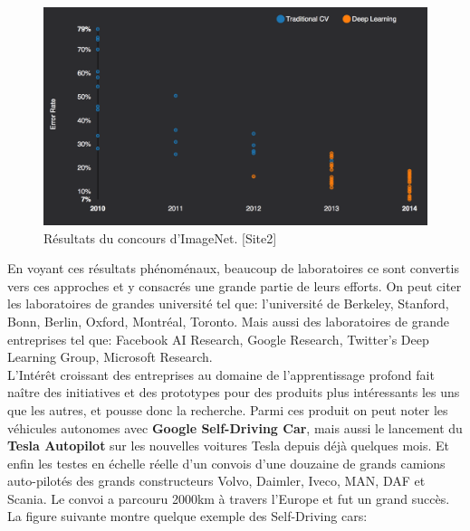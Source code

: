 \begin{figure}[H]
	\centering
		\includegraphics[width=5in]{Figures/clairifaiIMAGENET.png}
	\caption[An Electron]{Résultats du concours d'ImageNet. [Site2]}
	\label{fig:Electron}
\end{figure}

	En voyant ces résultats phénoménaux, beaucoup de laboratoires ce sont convertis vers ces approches et y consacrés une grande partie de leurs efforts. On peut citer les laboratoires de grandes université tel que: l'université de Berkeley, Stanford, Bonn, Berlin, Oxford, Montréal, Toronto. Mais aussi des laboratoires de grande entreprises tel que: Facebook AI Research, Google Research, Twitter’s Deep Learning Group, Microsoft Research.\\

	L’Intérêt croissant des entreprises au domaine de l'apprentissage profond fait naître des initiatives et des prototypes pour des produits plus intéressants les uns que les autres, et pousse donc la recherche. Parmi ces produit on peut noter les véhicules autonomes avec \textbf{Google Self-Driving Car}, mais aussi le lancement du \textbf{Tesla Autopilot} sur les nouvelles voitures Tesla depuis déjà quelques mois. Et enfin les testes en échelle réelle d'un convois d'une douzaine de grands camions auto-pilotés des grands constructeurs Volvo, Daimler, Iveco, MAN, DAF et Scania. Le convoi a parcouru 2000km à travers l’Europe et fut un grand succès. La figure suivante montre quelque exemple des Self-Driving cars:

